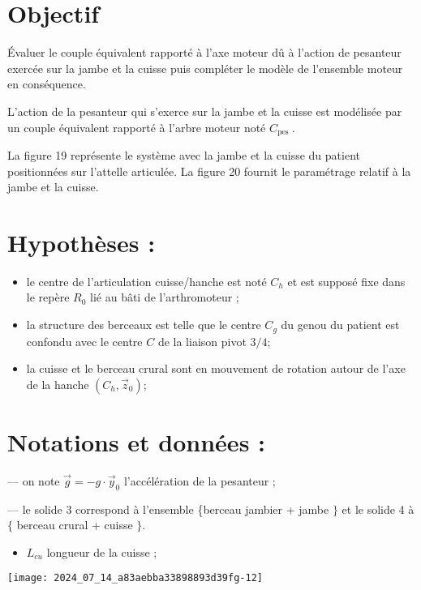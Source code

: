 \section*{Objectif}
Évaluer le couple équivalent rapporté à l'axe moteur dû à l'action de pesanteur exercée sur la jambe et la cuisse puis compléter le modèle de l'ensemble moteur en conséquence.

L'action de la pesanteur qui s'exerce sur la jambe et la cuisse est modélisée par un couple équivalent rapporté à l'arbre moteur noté $C_{\text {pes }}$.

La figure 19 représente le système avec la jambe et la cuisse du patient positionnées sur l'attelle articulée. La figure 20 fournit le paramétrage relatif à la jambe et la cuisse.

\section*{Hypothèses :}
\begin{itemize}
  \item le centre de l'articulation cuisse/hanche est noté $C_{h}$ et est supposé fixe dans le repère $R_{0}$ lié au bâti de l'arthromoteur ;

  \item la structure des berceaux est telle que le centre $C_{g}$ du genou du patient est confondu avec le centre $C$ de la liaison pivot $3 / 4$;

  \item la cuisse et le berceau crural sont en mouvement de rotation autour de l'axe de la hanche $\left(C_{h}, \vec{z}_{0}\right)$;

\end{itemize}

\section*{Notations et données :}
— on note $\vec{g}=-g \cdot \vec{y}_{0}$ l'accélération de la pesanteur ;

— le solide 3 correspond à l'ensemble \{berceau jambier + jambe $\}$ et le solide 4 à $\{$ berceau crural + cuisse $\}$.

\begin{itemize}
  \item $L_{c u}$ longueur de la cuisse ;
\end{itemize}

\begin{center}
\texttt{[image: 2024\_07\_14\_a83aebba33898893d39fg-12]}
\end{center}

